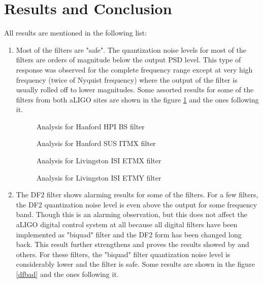 \documentclass[colorlinks=true,pdfstartview=FitV,linkcolor=blue,
            citecolor=red,urlcolor=magenta]{ligodoc}
\begin{document}
\section{Results and Conclusion} All results are mentioned in the following list:
	\begin{enumerate}
		\item Most of the filters are "safe". The quantization noise levels for most of the filters are orders of magnitude below the output PSD level. This type of response was observed for the complete frequency range except at very high frequency (twice of Nyquist frequency) where the output of the filter is usually rolled off to lower magnitudes. Some assorted results for some of the filters from both aLIGO sites are shown in the figure \ref{good} and the ones following it.
		\begin{figure}[H]
 
			  \centering
			  
			  \def\svgscale{0.5}
			  \tiny{
			  
			  }
			  \caption{Analysis for Hanford HPI BS filter}
			 \label{good}
		\end{figure}
		\begin{figure}[H]
 
			  \centering
			  \def\svgscale{0.5}
			  \tiny{
			  
			  }
			  \caption{Analysis for Hanford SUS ITMX filter}
		\end{figure}
		\begin{figure}[H]
 
			  \centering
			  \def\svgscale{0.5}		 
			  \tiny{ 
			  
			  }
			  \caption{Analysis for Livingston ISI ETMX filter}
		\end{figure}
		\begin{figure}[H]
 
			  \centering
			  \def\svgscale{0.5}
			  \tiny{
			  
			  }
			  \caption{Analysis for Livingston ISI ETMY filter}
		\end{figure}
		\item The DF2 filter shows alarming results for some of the filters. For a few filters, the DF2 quantization noise level is even above the output for some frequency band.  Though this is an alarming observation, but this does not affect the aLIGO digital control system at all because all digital filters have been implemented as "biquad" filter and the DF2 form has been changed long back. This result further strengthens and proves the results showed by \cite{matts} and others. For these filters, the "biquad" filter quantization noise level is considerably lower and the filter is safe. Some results are shown in the figure \ref{dfbad} and the ones following it.
		\begin{figure}[H]
 

\end{figure}
\end{enumerate}
\end{document}

